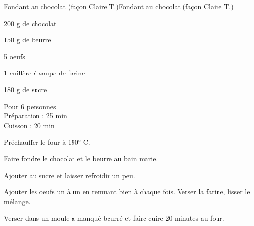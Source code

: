 \begin{recette}{Fondant au chocolat (façon Claire T.)}{Fondant au chocolat (façon Claire T.)}

\begin{ingredients}
200 g de chocolat\par
150 g de beurre\par
5 oeufs\par
1 cuillère à soupe de farine\par
180 g de sucre\par
\end{ingredients}

\begin{infos}
Pour 6 personnes\\
Préparation : 25 min\\
Cuisson : 20 min\\
\end{infos}

\begin{etapes}
\item Préchauffer le four à 190° C.
\item Faire fondre le chocolat et le beurre au bain marie.
\item Ajouter au sucre et laisser refroidir un peu.
\item Ajouter les oeufs un à un en remuant bien à chaque fois. Verser la farine, lisser le mélange.
\item Verser dans un moule à manqué beurré et faire cuire 20 minutes au four.
\end{etapes}

\end{recette}